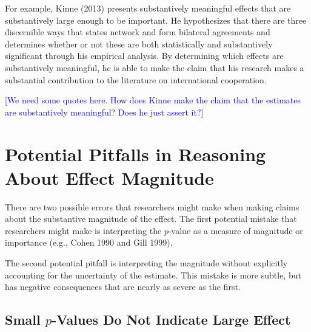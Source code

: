 \documentclass[12pt]{article}
\newcommand{\kelly}[1]{\textcolor{blue}{#1}}
\begin{document}
For example, Kinne (2013) presents substantively meaningful effects that are substantively large enough to be important. He hypothesizes that there are three discernible ways that states network and form bilateral agreements and determines whether or not these are both statistically and substantively significant through his empirical analysis. By determining which effects are substantively meaningful, he is able to make the claim that his research makes a substantial contribution to the literature on international cooperation. 

\kelly{[We need some quotes here. How does Kinne make the claim that the estimates are substantively meaningful? Does he just assert it?]}

\section*{Potential Pitfalls in Reasoning About Effect Magnitude}

There are two possible errors that researchers might make when making claims about the substantive magnitude of the effect. The first potential mistake that researchers might make is interpreting the $p$-value as a measure of magnitude or importance (e.g., Cohen 1990 and Gill 1999).

The second potential pitfall is interpreting the magnitude without explicitly accounting for the uncertainty of the estimate. This mistake is more subtle, but has negative consequences that are nearly as severe as the first. 

\subsection*{Small $p$-Values Do Not Indicate Large Effect}
\end{document}
